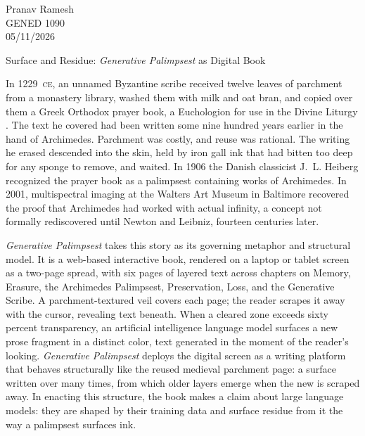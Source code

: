 \documentclass[12pt]{article}
\begin{document}
\noindent Pranav Ramesh\\
GENED 1090\\
05/11/2026

\begin{center}
  Surface and Residue: \textit{Generative Palimpsest} as Digital Book
\end{center}

\noindent In 1229~\textsc{ce}, an unnamed Byzantine scribe received twelve
leaves of parchment from a monastery library, washed them with milk and oat
bran, and copied over them a Greek Orthodox prayer book, a Euchologion for
use in the Divine Liturgy \parencite{netz2007}. The text he covered had been
written some nine hundred years earlier in the hand of Archimedes. Parchment was costly, and reuse was rational. The writing he erased descended
into the skin, held by iron gall ink that had bitten too deep for any sponge
to remove, and waited. In 1906 the Danish
classicist J.~L. Heiberg recognized the prayer book as a palimpsest containing
works of Archimedes. In 2001, multispectral imaging at the Walters Art Museum
in Baltimore recovered the proof that Archimedes had worked with actual
infinity, a concept not formally rediscovered until Newton and Leibniz,
fourteen centuries later.

\textit{Generative Palimpsest} takes this story as its governing metaphor and
structural model. It is a web-based interactive book, rendered on a laptop or
tablet screen as a two-page spread, with six pages of layered text across
chapters on Memory, Erasure, the Archimedes Palimpsest, Preservation, Loss,
and the Generative Scribe. A parchment-textured veil covers each page; the
reader scrapes it away with the cursor, revealing text beneath. When a cleared
zone exceeds sixty percent transparency, an artificial intelligence language
model surfaces a new prose fragment in a distinct color, text generated in the
moment of the reader's looking. \textit{Generative Palimpsest}
deploys the digital screen as a writing platform that behaves structurally like
the reused medieval parchment page: a surface written over many times, from
which older layers emerge when the new is scraped away. In enacting this
structure, the book makes a claim about large language models: they are shaped
by their training data and surface residue from it the way a palimpsest
surfaces ink.
\end{document}
